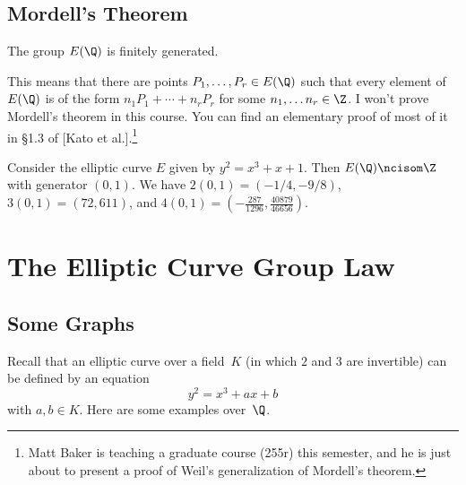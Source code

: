 \documentclass[11pt]{report}
\begin{document}
\section{Mordell's Theorem}
\begin{theorem}[Mordell]
  The group $E(\Q)$ is finitely generated.
\end{theorem}
This means that there are points $P_1,\ldots, P_r \in E(\Q)$
such that every element of $E(\Q)$ is of the form
$
  n_1 P_1 + \cdots + n_r P_r
$
for some $n_1, \ldots n_r\in\Z$.  I won't prove Mordell's theorem in
this course.  You can find an elementary proof of most of it in \S1.3
of [Kato et al.].\footnote{Matt Baker is teaching a graduate course
  (255r) this semester, and he is just about to present a proof of
  Weil's generalization of Mordell's theorem.}

\begin{example}
  Consider the elliptic curve $E$ given by $y^2 = x^3 + x +1$.
  Then $E(\Q)\ncisom \Z$ with generator $(0,1)$.  We have
  $2(0,1)=(-1/4, -9/8)$,
  $3(0,1)=(72,611)$,
  and $4(0,1)=\left(-\frac{287}{1296}, \frac{40879}{46656}\right)$.
\end{example}






\chapter{The Elliptic Curve Group Law}




\section{Some Graphs}
Recall that an elliptic curve over a field~$K$ (in which $2$ and $3$
are invertible) can be defined by  an equation
$$y^2 = x^3 + ax +b$$
with $a, b\in K$.   Here are some examples over~$\Q$.
\end{document}
